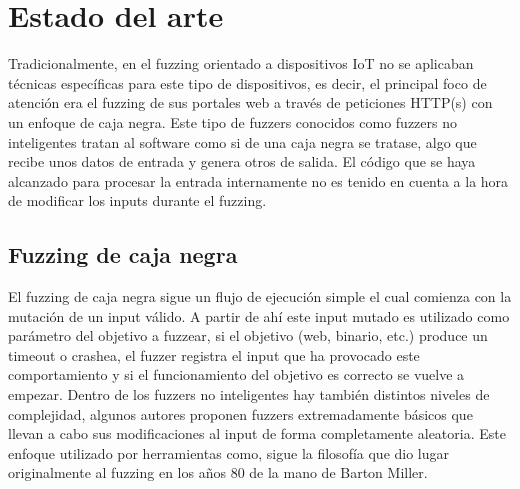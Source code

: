 \chapter{Estado del arte}
\label{estado_del_arte}
Tradicionalmente, en el fuzzing orientado a dispositivos IoT no se aplicaban técnicas
específicas para este tipo de dispositivos, es decir, el principal foco de atención era el fuzzing de sus portales web a través 
de peticiones HTTP(s) con un enfoque de caja negra. Este tipo de fuzzers conocidos como fuzzers no inteligentes tratan al software como si de una caja negra se tratase, 
algo que recibe unos datos de entrada y genera otros de salida. El código que se haya alcanzado para procesar la entrada internamente no es tenido en
cuenta a la hora de modificar los inputs durante el fuzzing.

\section{Fuzzing de caja negra}
El fuzzing de caja negra sigue un flujo de ejecución simple el cual comienza con la mutación de un input válido.
A partir de ahí este input mutado es utilizado como parámetro del objetivo a fuzzear, si el 
objetivo (web, binario, etc.) produce un timeout o crashea, el fuzzer registra el input que 
ha provocado este comportamiento y si el funcionamiento del objetivo es correcto se vuelve a empezar. Dentro de los fuzzers no inteligentes hay también
distintos niveles de complejidad, algunos autores proponen fuzzers extremadamente básicos que 
llevan a cabo sus modificaciones al input de forma completamente aleatoria. Este enfoque utilizado por 
herramientas como\cite{zzuf}, sigue la filosofía que dio lugar originalmente al fuzzing en 
los años 80 de la mano de Barton Miller\cite{Miller1990}.


